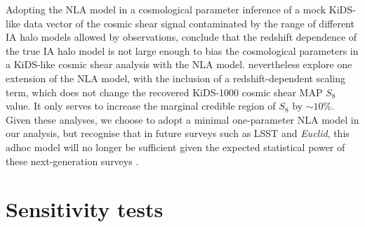 \begin{appendix}
Adopting the NLA model in a cosmological parameter inference of a mock KiDS-like data vector of the cosmic shear signal contaminated by the range of different IA halo models allowed by observations, \citet{fortuna/etal:2020} conclude that the redshift dependence of the true IA halo model is not large enough to bias the cosmological parameters in a KiDS-like cosmic shear analysis with the NLA model.   \citet{asgari/etal:2020} nevertheless explore one extension of the NLA model, with the inclusion of a redshift-dependent scaling term, which does not change the recovered KiDS-1000 cosmic shear MAP $S_8$ value.  It only serves to increase the marginal credible region of $S_8$ by $\sim 10\%$.   Given these analyses, we choose to adopt a minimal one-parameter NLA model in our \tttp analysis, but recognise that in future surveys such as LSST and {\it Euclid}, this adhoc model will no longer be sufficient given the expected statistical power of these next-generation surveys \citep{blazek/etal:2019, fortuna/etal:2020}.


\section{Sensitivity tests}
\label{app:sensitivity}


\end{appendix}
